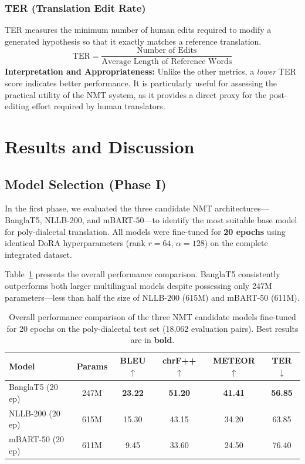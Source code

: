 \documentclass[12pt,a4paper]{article}
\begin{document}
\subsubsection{TER (Translation Edit Rate)}
TER \cite{snover2006study} measures the minimum number of human edits required to modify a generated hypothesis so that it exactly matches a reference translation.
\begin{equation}
\text{TER} = \frac{\text{Number of Edits}}{\text{Average Length of Reference Words}}
\end{equation}
\textbf{Interpretation and Appropriateness:} Unlike the other metrics, a \textit{lower} TER score indicates better performance. It is particularly useful for assessing the practical utility of the NMT system, as it provides a direct proxy for the post-editing effort required by human translators.

\newpage

\section{Results and Discussion}

\subsection{Model Selection (Phase I)}
In the first phase, we evaluated the three candidate NMT architectures---BanglaT5, NLLB-200, and mBART-50---to identify the most suitable base model for poly-dialectal translation. All models were fine-tuned for \textbf{20 epochs} using identical DoRA hyperparameters (rank $r=64$, $\alpha=128$) on the complete integrated dataset.

Table~\ref{tab:model_results_search} presents the overall performance comparison. BanglaT5 consistently outperforms both larger multilingual models despite possessing only 247M parameters---less than half the size of NLLB-200 (615M) and mBART-50 (611M).

\begin{table}[htbp]
\centering
\small
\caption{Overall performance comparison of the three NMT candidate models fine-tuned for 20 epochs on the poly-dialectal test set (18,062 evaluation pairs). Best results are in \textbf{bold}.}
\label{tab:model_results_search}
\begin{tabular}{l c c c c c}
\toprule
\textbf{Model} & \textbf{Params} & \textbf{BLEU $\uparrow$} & \textbf{chrF++ $\uparrow$} & \textbf{METEOR $\uparrow$} & \textbf{TER $\downarrow$} \\
\midrule
BanglaT5 (20 ep) & 247M & \textbf{23.22} & \textbf{51.20} & \textbf{41.41} & \textbf{56.85} \\
NLLB-200 (20 ep) & 615M & 15.30 & 43.15 & 34.20 & 63.85 \\
mBART-50 (20 ep) & 611M &  9.45 & 33.60 & 24.50 & 76.40 \\
\bottomrule
\end{tabular}
\end{table}
\end{document}
